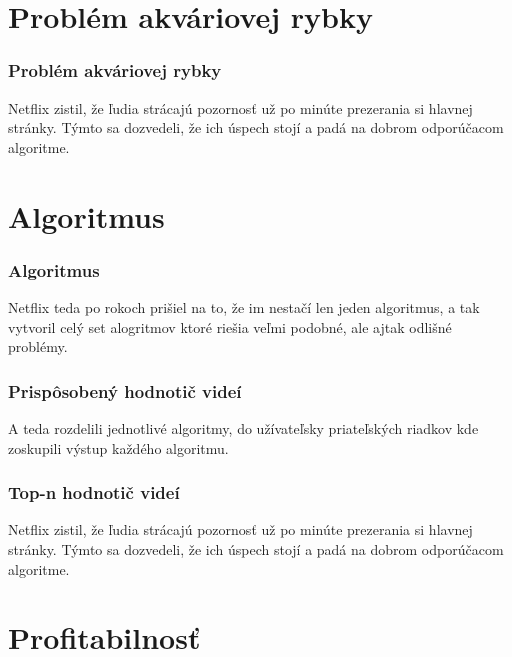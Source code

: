 \documentclass{beamer}
\begin{document}
\section{Problém akváriovej rybky}

\begin{frame}[fragile=singleslide]\frametitle{Problém akváriovej rybky}
    Netflix zistil, že ľudia strácajú pozornosť už po minúte prezerania si hlavnej stránky. Týmto sa dozvedeli, že ich úspech stojí a padá na dobrom odporúčacom algoritme.
\end{frame}

\section{Algoritmus}

\begin{frame}[fragile=singleslide]\frametitle{Algoritmus}
    Netflix teda po rokoch prišiel na to, že im nestačí len jeden algoritmus, a tak vytvoril celý set alogritmov ktoré riešia veľmi podobné, ale ajtak odlišné problémy.
\end{frame}

\begin{frame}[fragile=singleslide]\frametitle{Prispôsobený hodnotič videí}
    A teda rozdelili jednotlivé algoritmy, do užívateľsky priateľských riadkov kde zoskupili výstup každého algoritmu.
\end{frame}

\begin{frame}[fragile=singleslide]\frametitle{Top-n hodnotič videí}
    Netflix zistil, že ľudia strácajú pozornosť už po minúte prezerania si hlavnej stránky. Týmto sa dozvedeli, že ich úspech stojí a padá na dobrom odporúčacom algoritme.
\end{frame}


\section{Profitabilnosť}
\end{document}
